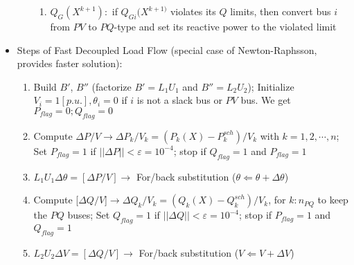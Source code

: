 \begin{itemize}
\begin{itemize}
\begin{enumerate}
          \item $Q_G(X^{k+1}):$ if $Q_{Gi}(X^{k+1)}$ violates its $Q$ limits, then convert bus $i$ from $PV$ to $PQ$-type and set its reactive power to the violated limit

        \end{enumerate}

    \end{itemize}

  \item Steps of Fast Decoupled Load Flow (special case of Newton-Raphsson, provides faster solution):

    \begin{enumerate}

      \item Build $B'$, $B''$ (factorize $B'=L_1U_1$ and $B''=L_2U_2$); Initialize $V_i=1[p.u.],\theta_i=0$ if $i$ is not a slack bus or $PV$ bus. We get $P_{flag}=0;Q_{flag}=0$

      \item Compute $\Delta P/V\to \Delta P_k/V_k=(P_k(X)-P_k^{sch})/V_k$ with $k=1,2,\cdots,n$; Set $P_{flag}=1$ if $||\Delta P||<\varepsilon=10^{-4}$; stop if $Q_{flag}=1$ and $P_{flag}=1$

      \item $L_1U_1\Delta \theta=[\Delta P/V]\to$ For/back substitution ($\theta\Leftarrow \theta+\Delta \theta$)

      \item Compute [$\Delta Q/V$]$\to \Delta Q_k/V_k=(Q_k(X)-Q_k^{sch})/V_k$, for $k:n_{PQ}$ to keep the $PQ$ buses; Set $Q_{flag}=1$ if $||\Delta Q||<\varepsilon=10^{-4}$; stop if $P_{flag}=1$ and $Q_{flag}=1$

      \item $L_2U_2\Delta V=[\Delta Q/V]\to$ For/back substitution ($V\Leftarrow V+\Delta V$)

    \end{enumerate}

\end{itemize}



